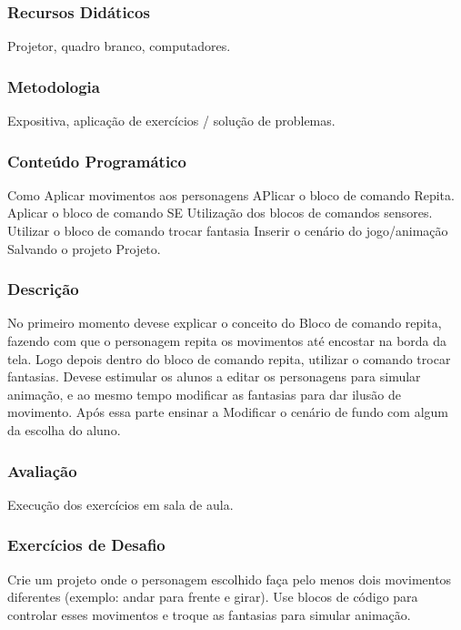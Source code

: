 \documentclass[letterpaper,10pt,brazil]{sphinxmanual}
\begin{document}
\subsubsection*{Recursos Didáticos}

\sphinxAtStartPar
Projetor, quadro branco, computadores.
\subsubsection*{Metodologia}

\sphinxAtStartPar
Expositiva, aplicação de exercícios / solução de problemas.
\subsubsection*{Conteúdo Programático}

\sphinxAtStartPar
Como Aplicar movimentos aos personagens
APlicar o bloco de comando Repita.
Aplicar o bloco de comando SE
Utilização dos blocos de comandos sensores.
Utilizar o bloco de comando trocar fantasia
Inserir o cenário do jogo/animação
Salvando o projeto Projeto.
\subsubsection*{Descrição}

\sphinxAtStartPar
No primeiro momento deve\sphinxhyphen{}se explicar o conceito do Bloco de comando repita, fazendo com
que o personagem repita os movimentos até encostar na borda da tela.
Logo depois dentro do bloco de comando repita, utilizar o comando trocar fantasias.
Deve\sphinxhyphen{}se estimular os alunos a editar os personagens para simular animação, e ao mesmo
tempo modificar as fantasias para dar ilusão de movimento. Após essa parte ensinar a
Modificar o cenário de fundo com algum da escolha do aluno.
\subsubsection*{Avaliação}

\sphinxAtStartPar
Execução dos exercícios em sala de aula.
\subsubsection*{Exercícios de Desafio}

\sphinxAtStartPar
{}
Crie um projeto onde o personagem escolhido faça pelo menos dois movimentos diferentes (exemplo: andar para frente e girar).
Use blocos de código para controlar esses movimentos e troque as fantasias para simular animação.
\end{document}
